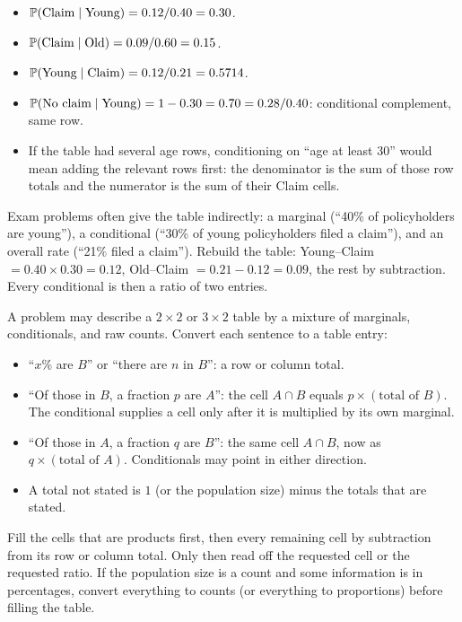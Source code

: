 \begin{itemize}[nosep]
\item $\mathbb{P}(\text{Claim} \mid \text{Young}) = 0.12/0.40 = 0.30$.
\item $\mathbb{P}(\text{Claim} \mid \text{Old}) = 0.09/0.60 = 0.15$.
\item $\mathbb{P}(\text{Young} \mid \text{Claim}) = 0.12/0.21 = 0.5714$.
\item $\mathbb{P}(\text{No claim} \mid \text{Young}) = 1 - 0.30 = 0.70 = 0.28/0.40$: conditional complement, same row.
\item If the table had several age rows, conditioning on ``age at least 30''
would mean adding the relevant rows first: the denominator is the sum of those
row totals and the numerator is the sum of their Claim cells.
\end{itemize}

Exam problems often give the table indirectly: a marginal (``40\% of
policyholders are young''), a conditional (``30\% of young policyholders filed
a claim''), and an overall rate (``21\% filed a claim''). Rebuild the table:
Young--Claim $= 0.40 \times 0.30 = 0.12$, Old--Claim $= 0.21 - 0.12 = 0.09$,
the rest by subtraction. Every conditional is then a ratio of two entries.

\begin{keyfact}
A problem may describe a $2 \times 2$ or $3 \times 2$ table by a mixture of
marginals, conditionals, and raw counts. Convert each sentence to a table entry:
\begin{itemize}[nosep]
\item ``$x$\% are $B$'' or ``there are $n$ in $B$'': a row or column total.
\item ``Of those in $B$, a fraction $p$ are $A$'': the cell $A \cap B$ equals
$p \times (\text{total of } B)$. The conditional supplies a cell only after it is
multiplied by its own marginal.
\item ``Of those in $A$, a fraction $q$ are $B$'': the same cell $A \cap B$, now
as $q \times (\text{total of } A)$. Conditionals may point in either direction.
\item A total not stated is $1$ (or the population size) minus the totals that
are stated.
\end{itemize}
Fill the cells that are products first, then every remaining cell by
subtraction from its row or column total. Only then read off the requested
cell or the requested ratio. If the population size is a count and some
information is in percentages, convert everything to counts (or everything to
proportions) before filling the table.
\end{keyfact}

